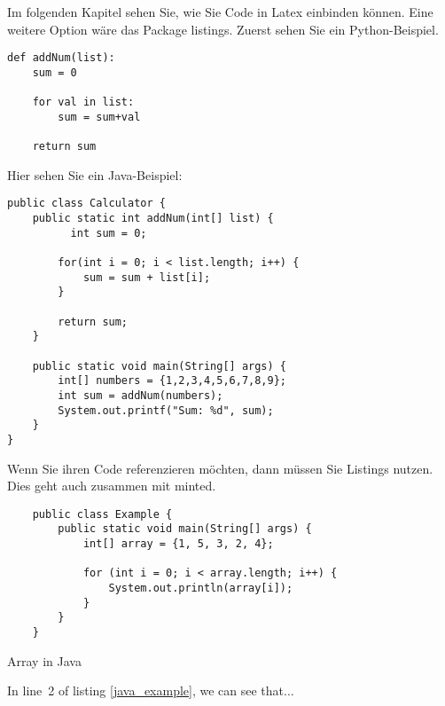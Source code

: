 
Im folgenden Kapitel sehen Sie, wie Sie Code in Latex einbinden können. Eine weitere Option wäre das Package listings. Zuerst sehen Sie ein Python-Beispiel.

\begin{verbatim}
def addNum(list):
    sum = 0
    
    for val in list:
        sum = sum+val
        
    return sum
\end{verbatim}

Hier sehen Sie ein Java-Beispiel:

\begin{verbatim}
public class Calculator {
    public static int addNum(int[] list) {
          int sum = 0;

        for(int i = 0; i < list.length; i++) {
            sum = sum + list[i];
        }

        return sum;
    }

    public static void main(String[] args) {
        int[] numbers = {1,2,3,4,5,6,7,8,9};
        int sum = addNum(numbers);
        System.out.printf("Sum: %d", sum);
    }
}
\end{verbatim}


Wenn Sie ihren Code referenzieren möchten, dann müssen Sie Listings nutzen. Dies geht auch zusammen mit minted. 

\begin{listing}
\begin{verbatim}
    public class Example {
        public static void main(String[] args) {
            int[] array = {1, 5, 3, 2, 4};
            
            for (int i = 0; i < array.length; i++) {
                System.out.println(array[i]);
            }
        }
    }
\end{verbatim}
\caption{Array in Java}
\label{java_example}
\end{listing}
\newpage

In line~2 of listing \ref{java_example}, we can see that...

